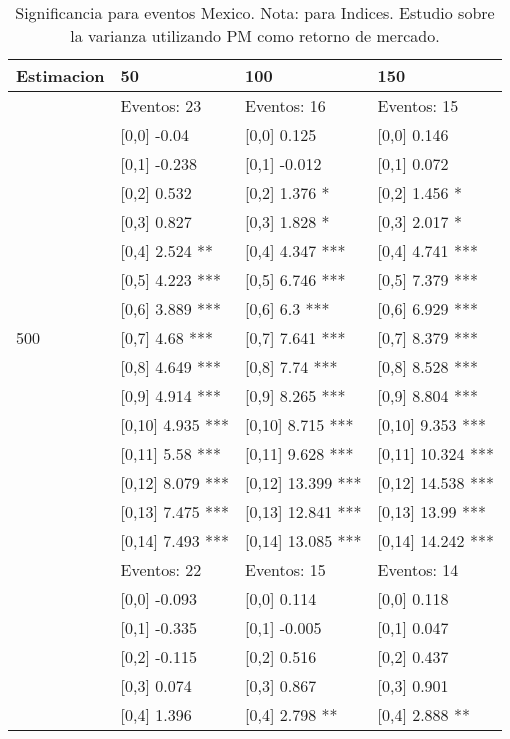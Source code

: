 \begin{table}

\caption{Significancia para eventos Mexico. Nota: para Indices. Estudio sobre la varianza utilizando PM como retorno de mercado.}
\centering
\begin{tabular}[t]{llll}
\toprule
Estimacion & 50 & 100 & 150\\
\midrule
 & Eventos:  23 & Eventos:  16 & Eventos:  15\\
 & {}[0,0] -0.04 & {}[0,0] 0.125 & {}[0,0] 0.146\\
 & {}[0,1] -0.238 & {}[0,1] -0.012 & {}[0,1] 0.072\\
 & {}[0,2] 0.532 & {}[0,2] 1.376 * & {}[0,2] 1.456 *\\
 & {}[0,3] 0.827 & {}[0,3] 1.828 * & {}[0,3] 2.017 *\\
\addlinespace
 & {}[0,4] 2.524 ** & {}[0,4] 4.347 *** & {}[0,4] 4.741 ***\\
 & {}[0,5] 4.223 *** & {}[0,5] 6.746 *** & {}[0,5] 7.379 ***\\
 & {}[0,6] 3.889 *** & {}[0,6] 6.3 *** & {}[0,6] 6.929 ***\\
500 & {}[0,7] 4.68 *** & {}[0,7] 7.641 *** & {}[0,7] 8.379 ***\\
 & {}[0,8] 4.649 *** & {}[0,8] 7.74 *** & {}[0,8] 8.528 ***\\
\addlinespace
 & {}[0,9] 4.914 *** & {}[0,9] 8.265 *** & {}[0,9] 8.804 ***\\
 & {}[0,10] 4.935 *** & {}[0,10] 8.715 *** & {}[0,10] 9.353 ***\\
 & {}[0,11] 5.58 *** & {}[0,11] 9.628 *** & {}[0,11] 10.324 ***\\
 & {}[0,12] 8.079 *** & {}[0,12] 13.399 *** & {}[0,12] 14.538 ***\\
 & {}[0,13] 7.475 *** & {}[0,13] 12.841 *** & {}[0,13] 13.99 ***\\
\addlinespace
 & {}[0,14] 7.493 *** & {}[0,14] 13.085 *** & {}[0,14] 14.242 ***\\
 & Eventos:  22 & Eventos:  15 & Eventos:  14\\
 & {}[0,0] -0.093 & {}[0,0] 0.114 & {}[0,0] 0.118\\
 & {}[0,1] -0.335 & {}[0,1] -0.005 & {}[0,1] 0.047\\
 & {}[0,2] -0.115 & {}[0,2] 0.516 & {}[0,2] 0.437\\
\addlinespace
 & {}[0,3] 0.074 & {}[0,3] 0.867 & {}[0,3] 0.901\\
 & {}[0,4] 1.396 & {}[0,4] 2.798 ** & {}[0,4] 2.888 **\\

\end{tabular}
\end{table}

